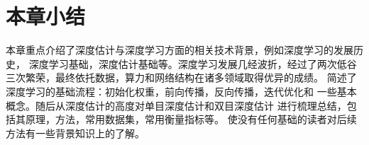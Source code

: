 \section{本章小结}
本章重点介绍了深度估计与深度学习方面的相关技术背景，例如深度学习的发展历史，
深度学习基础，深度估计基础等。深度学习发展几经波折，经过了两次低谷
三次繁荣，最终依托数据，算力和网络结构在诸多领域取得优异的成绩。
简述了深度学习的基础流程：初始化权重，前向传播，反向传播，迭代优化和
一些基本概念。随后从深度估计的高度对单目深度估计和双目深度估计
进行梳理总结，包括其原理，方法，常用数据集，常用衡量指标等。
使没有任何基础的读者对后续方法有一些背景知识上的了解。